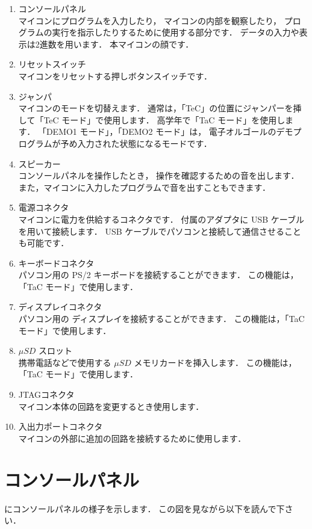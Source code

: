 \begin{enumerate}
\item コンソールパネル \\
マイコンにプログラムを入力したり，
マイコンの内部を観察したり，
プログラムの実行を指示したりするために使用する部分です．
データの入力や表示は2進数を用います．
本マイコンの顔です．
\item リセットスイッチ \\
マイコンをリセットする押しボタンスイッチです．
\item ジャンパ \\
マイコンのモードを切替えます．
通常は，「TeC」の位置にジャンパーを挿して「TeC モード」で使用します．
高学年で「TaC モード」を使用します．
「DEMO1 モード」，「DEMO2 モード」は，
電子オルゴールのデモプログラムが予め入力された状態になるモードです．
\item スピーカー \\
コンソールパネルを操作したとき，
操作を確認するための音を出します．
また，マイコンに入力したプログラムで音を出すこともできます．
\item 電源コネクタ \\
マイコンに電力を供給するコネクタです．
付属のアダプタに USB ケーブルを用いて接続します．
USB ケーブルでパソコンと接続して通信させることも可能です．
\item キーボードコネクタ \\
パソコン用の PS/2 キーボードを接続することができます．
この機能は，「TaC モード」で使用します．
\item ディスプレイコネクタ \\
パソコン用の ディスプレイを接続することができます．
この機能は，「TaC モード」で使用します．
\item $\mu SD$ スロット \\
携帯電話などで使用する $\mu SD$ メモリカードを挿入します．
この機能は，「TaC モード」で使用します．
\item JTAGコネクタ \\
マイコン本体の回路を変更するとき使用します．
\item 入出力ポートコネクタ \\
マイコンの外部に追加の回路を接続するために使用します．
\end{enumerate}

\section{コンソールパネル}
にコンソールパネルの様子を示します．
この図を見ながら以下を読んで下さい．

